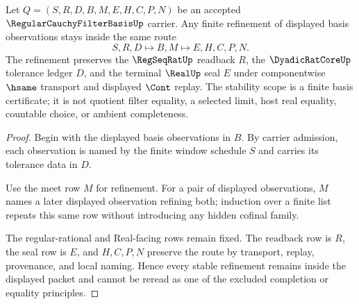 \begin{theorem}
\label{thm:regular-cauchy-filter-basis-stability-scope}
Let $Q=(S,R,D,B,M,E,H,C,P,N)$ be an accepted $\RegularCauchyFilterBasisUp$ carrier. Any finite refinement of displayed basis observations stays inside the same route
$$
S,R,D \longmapsto B,M \longmapsto E,H,C,P,N .
$$
The refinement preserves the $\RegSeqRatUp$ readback $R$, the $\DyadicRatCoreUp$ tolerance ledger $D$, and the terminal $\RealUp$ seal $E$ under componentwise $\hsame$ transport and displayed $\Cont$ replay. The stability scope is a finite basis certificate; it is not quotient filter equality, a selected limit, host real equality, countable choice, or ambient completeness.
\end{theorem}
\begin{proof}
Begin with the displayed basis observations in $B$. By carrier admission, each observation is named by the finite window schedule $S$ and carries its tolerance data in $D$.

Use the meet row $M$ for refinement. For a pair of displayed observations, $M$ names a later displayed observation refining both; induction over a finite list repeats this same row without introducing any hidden cofinal family.

The regular-rational and Real-facing rows remain fixed. The readback row is $R$, the seal row is $E$, and $H,C,P,N$ preserve the route by transport, replay, provenance, and local naming. Hence every stable refinement remains inside the displayed packet and cannot be reread as one of the excluded completion or equality principles.
\end{proof}




